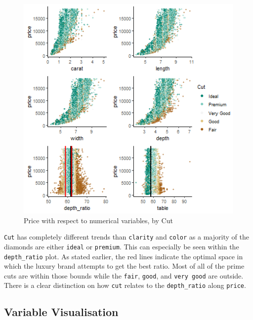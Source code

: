 \documentclass[
  paper=a4,
  ,captions=tableheading
]{scrartcl}
\begin{document}
\begin{figure}[H]

{\centering \includegraphics[width=\linewidth,]{Diamonds_PDF_files/figure-latex/Price by X and Cut-1} 

}

\caption{Price with respect to numerical variables, by Cut}\label{fig:Price by X and Cut}
\end{figure}

\texttt{Cut} has completely different trends than \texttt{clarity} and
\texttt{color} as a majority of the diamonds are either \texttt{ideal}
or \texttt{premium}. This can especially be seen within the
\texttt{depth\_ratio} plot. As stated earlier, the red lines indicate
the optimal space in which the luxury brand attempts to get the best
ratio. Most of all of the prime cuts are within those bounds while the
\texttt{fair}, \texttt{good}, and \texttt{very\ good} are outside. There
is a clear distinction on how \texttt{cut} relates to the
\texttt{depth\_ratio} along \texttt{price}.

\hypertarget{variable-visualisation}{%
\subsection{Variable Visualisation}\label{variable-visualisation}}
\end{document}
